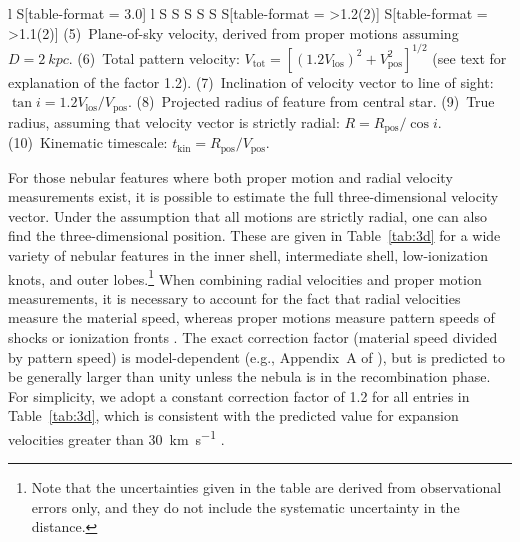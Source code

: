 \documentclass[useAMS, usenatbib]{mnras}
\begin{document}
\begin{table}
\begin{tabular}{
    l %
    S[table-format = 3.0] %
    l %
    S %
    S %
    S %
    S %
    S %
    S[table-format = >1.2(2)] %
    S[table-format = >1.1(2)] %
    }
{    (5)~Plane-of-sky velocity, derived from proper motions assuming \(D = \SI{2}{kpc}\).
    (6)~Total pattern velocity: \(V_{\text{tot}} = [ (1.2 V_{\text{los}})^2 + V_{\text{pos}}^2 ]^{1/2}\) (see text for explanation of the factor 1.2).
    (7)~Inclination of velocity vector to line of sight: \(\tan i = 1.2 V_{\text{los}} / V_{\text{pos}}\).
    (8)~Projected radius of feature from central star.
    (9)~True radius, assuming that velocity vector is strictly radial: \(R = R_{\text{pos}} / \cos i\).
    (10)~Kinematic timescale: \(t_{\text{kin}} = R_{\text{pos}} / V_{\text{pos}}\).
    }
  \end{tabular}
\end{table}

For those nebular features where both proper motion and radial velocity measurements exist,
it is possible to estimate the full three-dimensional velocity vector.
Under the assumption that all motions are strictly radial,
one can also find the three-dimensional position.
These are given in Table~\ref{tab:3d} for a wide variety of nebular features
in the inner shell, intermediate shell, low-ionization knots, and outer lobes.\footnote{
  Note that the uncertainties given in the table are derived from observational errors only,
  and they do not include the systematic uncertainty in the distance.
}
When combining radial velocities and proper motion measurements,
it is necessary to account for the fact that radial velocities measure the material speed,
whereas proper motions measure pattern speeds of shocks or ionization fronts \citep{Mellema:2004a}. 
The exact correction factor (material speed divided by pattern speed)
is model-dependent (e.g., Appendix~A of \citealp{ODell:2009c}),
but is predicted to be generally larger than unity
\citetext{see Fig.~8 of \citealp{Jacob:2013a}}
unless the nebula is in the recombination phase.
For simplicity, we adopt a constant correction factor of 1.2 for all entries in Table~\ref{tab:3d},
which is consistent with the predicted value for expansion velocities greater than \SI{30}{km.s^{-1}}
\citetext{see Fig.~3 of \citealp{Schonberner:2019a}}.
\end{document}
